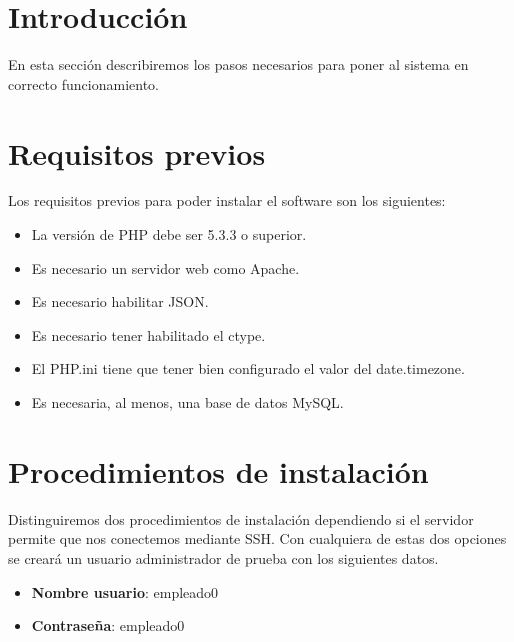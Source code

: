

\section{Introducción}
En esta sección describiremos los pasos necesarios para poner al sistema en correcto funcionamiento. 

\section{Requisitos previos}
Los requisitos previos para poder instalar el software son los siguientes:
\begin{itemize}
\item La versión de PHP debe ser 5.3.3 o superior.
\item Es necesario un servidor web como Apache.
\item Es necesario habilitar JSON.
\item Es necesario tener habilitado el ctype.
\item El PHP.ini tiene que tener bien configurado el valor del date.timezone.
\item Es necesaria, al menos, una base de datos MySQL.
\end{itemize}

\section{Procedimientos de instalación}
Distinguiremos dos procedimientos de instalación dependiendo si el servidor permite que nos conectemos mediante SSH. Con cualquiera de estas dos opciones se creará un usuario administrador de prueba con los siguientes datos.
\begin{itemize}
\item \textbf{Nombre usuario}: empleado0
\item \textbf{Contraseña}: empleado0
\end{itemize}

